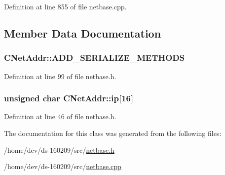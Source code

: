 Definition at line 855 of file netbase.\+cpp.



\subsection{Member Data Documentation}
\hypertarget{class_c_net_addr_ab08e22719f96b42c61e998158a895e5f}{}
\subsubsection[{A\+D\+D\+\_\+\+S\+E\+R\+I\+A\+L\+I\+Z\+E\+\_\+\+M\+E\+T\+H\+O\+D\+S}]{\setlength{\rightskip}{0pt plus 5cm}C\+Net\+Addr\+::\+A\+D\+D\+\_\+\+S\+E\+R\+I\+A\+L\+I\+Z\+E\+\_\+\+M\+E\+T\+H\+O\+D\+S}\label{class_c_net_addr_ab08e22719f96b42c61e998158a895e5f}


Definition at line 99 of file netbase.\+h.

\hypertarget{class_c_net_addr_acff7ce68f33f8dfbfe6d79d80928d417}{}
\subsubsection[{ip}]{\setlength{\rightskip}{0pt plus 5cm}unsigned char C\+Net\+Addr\+::ip\mbox{[}16\mbox{]}\hspace{0.3cm}{\ttfamily [protected]}}\label{class_c_net_addr_acff7ce68f33f8dfbfe6d79d80928d417}


Definition at line 46 of file netbase.\+h.



The documentation for this class was generated from the following files\+:\begin{DoxyCompactItemize}
\item 
/home/dev/ds-\/160209/src/\hyperlink{netbase_8h}{netbase.\+h}\item 
/home/dev/ds-\/160209/src/\hyperlink{netbase_8cpp}{netbase.\+cpp}\end{DoxyCompactItemize}

